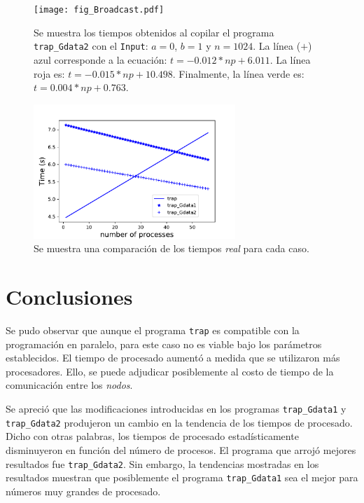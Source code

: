 \documentclass[twocolumn]{article}
\begin{document}
\begin{figure}
    \centering
    \texttt{[image: fig\_Broadcast.pdf]}
    \caption{Se muestra los tiempos obtenidos al copilar el programa \texttt{trap\_Gdata2} con el \texttt{Input}: $a=0$, $b=1$ y $n=1024$. La línea ($+$) azul corresponde a la ecuación: $t =-0.012*np + 6.011$. La línea roja es: $t =-0.015*np + 10.498$. Finalmente, la línea verde es: $t = 0.004*np + 0.763$. } \label{fig4}
\end{figure}

\begin{figure}
    \centering
    \includegraphics[width=3in]{fig_5.pdf}
    \caption{Se muestra una comparación de los tiempos \textit{real} para cada caso.} \label{fig5}
\end{figure}

\section{Conclusiones}
Se pudo observar que aunque el programa \texttt{trap} es compatible con la programación en paralelo, para este caso no es viable bajo los parámetros establecidos. El tiempo de procesado aumentó a medida que se utilizaron más procesadores. Ello, se puede adjudicar posiblemente al costo de tiempo de la comunicación entre los \textit{nodos}. 

Se apreció que las modificaciones introducidas en los programas \texttt{trap\_Gdata1} y \texttt{trap\_Gdata2} produjeron un cambio en la tendencia de los tiempos de procesado. Dicho con otras palabras, los tiempos de procesado  estadísticamente disminuyeron en función del número de procesos. El programa que arrojó mejores resultados fue \texttt{trap\_Gdata2}. Sin embargo, la tendencias mostradas en los resultados muestran que posiblemente el programa \texttt{trap\_Gdata1} sea el mejor para números muy grandes de procesado. 
\end{document}
